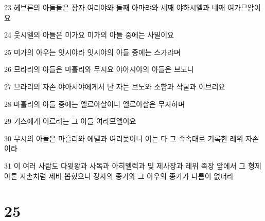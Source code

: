 \par 23 헤브론의 아들들은 장자 여리야와 둘째 아마랴와 세째 야하시엘과 네째 여가므암이요
\par 24 웃시엘의 아들은 미가요 미가의 아들 중에는 사밀이요
\par 25 미가의 아우는 잇시야라 잇시야의 아들 중에는 스가랴며
\par 26 므라리의 아들은 마흘리와 무시요 야아시야의 아들은 브노니
\par 27 므라리의 자손 야아시야에게서 난 자는 브노와 소함과 삭굴과 이브리요
\par 28 마흘리의 아들 중에는 엘르아살이니 엘르아살은 무자하며
\par 29 기스에게 이르러는 그 아들 여라므엘이요
\par 30 무시의 아들은 마흘리와 에델과 여리못이니 이는 다 그 족속대로 기록한 레위 자손이라
\par 31 이 여러 사람도 다윗왕과 사독과 아히멜렉과 및 제사장과 레위 족장 앞에서 그 형제 아론 자손처럼 제비 뽑혔으니 장자의 종가와 그 아우의 종가가 다름이 없더라

\chapter{25}

